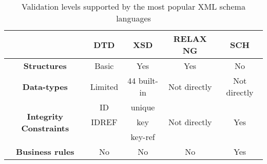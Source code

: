 \begin{table}[h]
	\centering {\small{}}%
	\begin{tabular}{|c|c|c|c|c|}
	\hline 
	 & \textbf{\small{}DTD}{\small{} } & \textbf{\small{}XSD}{\small{} } & \textbf{\small{}RELAX NG}{\small{} } & \textbf{\small{}SCH}\tabularnewline
	\hline 
	\hline 
	\textbf{\small{}Structures}{\small{} } & {\small{}Basic } & {\small{}Yes } & {\small{}Yes } & {\small{}No}\tabularnewline
	\hline 
	\textbf{\small{}Data-types}{\small{} } & {\small{}Limited } & {\small{}44 built-in } & {\small{}Not directly } & {\small{}Not directly}\tabularnewline
	\hline 
	\multirow{3}{*}{\textbf{\small{}Integrity Constraints}{\small{} }} & ID & {\small{}unique} & \multirow{3}{*}{{\small{}Not directly }} & \multirow{3}{*}{{\small{}Yes}}\tabularnewline
	 & IDREF & key &  & \tabularnewline
	 &  & key-ref &  & \tabularnewline
	\hline 
	\textbf{\small{}Business rules}{\small{} } & {\small{}No } & {\small{}No } & {\small{}No } & {\small{}Yes}\tabularnewline
	\hline 
	\end{tabular}{\small{}\caption{Validation levels supported by the most popular XML schema languages}
	\label{tab:background:schemasTable} }
\end{table}